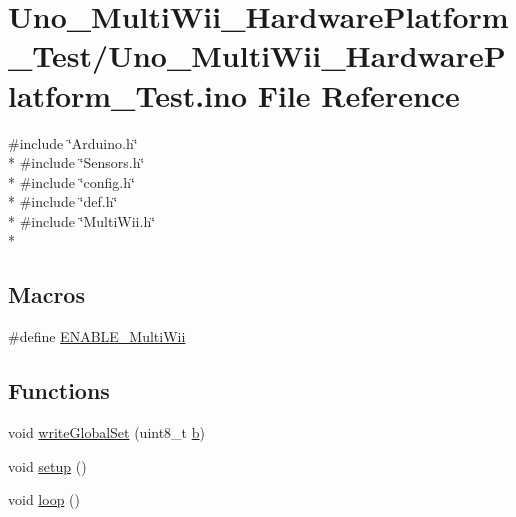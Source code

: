 \hypertarget{Uno__MultiWii__HardwarePlatform__Test_8ino}{\section{Uno\-\_\-\-Multi\-Wii\-\_\-\-Hardware\-Platform\-\_\-\-Test/\-Uno\-\_\-\-Multi\-Wii\-\_\-\-Hardware\-Platform\-\_\-\-Test.ino File Reference}
\label{Uno__MultiWii__HardwarePlatform__Test_8ino}
}
{\ttfamily \#include \char`\"{}Arduino.\-h\char`\"{}}\\*
{\ttfamily \#include \char`\"{}Sensors.\-h\char`\"{}}\\*
{\ttfamily \#include \char`\"{}config.\-h\char`\"{}}\\*
{\ttfamily \#include \char`\"{}def.\-h\char`\"{}}\\*
{\ttfamily \#include \char`\"{}Multi\-Wii.\-h\char`\"{}}\\*
\subsection*{Macros}
\begin{DoxyCompactItemize}
\item 
\#define \hyperlink{Uno__MultiWii__HardwarePlatform__Test_8ino_adf015ca3904d44694fa374780aaed5d3}{E\-N\-A\-B\-L\-E\-\_\-\-Multi\-Wii}
\end{DoxyCompactItemize}
\subsection*{Functions}
\begin{DoxyCompactItemize}
\item 
void \hyperlink{Uno__MultiWii__HardwarePlatform__Test_8ino_aff10ace493e58fd55ad25d3529f063e2}{write\-Global\-Set} (uint8\-\_\-t \hyperlink{IMU_8cpp_a20f3a6e8a2ba2537edf801801628417b}{b})
\item 
void \hyperlink{Uno__MultiWii__HardwarePlatform__Test_8ino_a4fc01d736fe50cf5b977f755b675f11d}{setup} ()
\item 
void \hyperlink{Uno__MultiWii__HardwarePlatform__Test_8ino_afe461d27b9c48d5921c00d521181f12f}{loop} ()
\end{DoxyCompactItemize}
